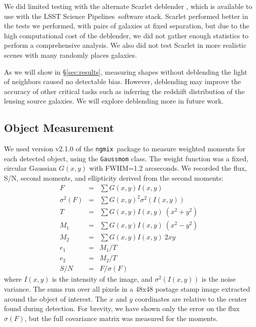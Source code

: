 \documentclass[twocolumn,twocolappendix,astrosym]{openjournal}
\newcommand{\ngmix}{\texttt{ngmix}}
\newcommand{\dm}{LSST Science Pipelines}
\begin{document}
We did limited testing with the alternate Scarlet deblender
\citep{MelchiorScarlet2018}, which is available to use with the \dm\ software
stack. Scarlet performed better in the tests we performed, with pairs of
galaxies at fixed separation, but due to the high computational cost of the
deblender, we did not gather enough statistics to perform a comprehensive
analysis.  We also did not test Scarlet in more realistic scenes with many
randomly places galaxies.

As we will show in \S \ref{sec:results}, measuring shapes without deblending
the light of neighbors caused no detectable bias.  However, deblending may
improve the accuracy of other critical tasks such as inferring the redshift
distribution of the lensing source galaxies.  We will explore deblending more
in future work.

\subsection{Object Measurement} \label{sec:mdet:meas}

We used version v2.1.0 of the \ngmix\ package to measure weighted moments for
each detected object, using the \texttt{Gaussmom} class. The weight function
was a fixed, circular Gaussian $G(x, y)$ with FWHM=1.2 arcseconds.  We
recorded the flux, S/N, second moments, and ellipticity derived from the second
moments:
\begin{eqnarray} \label{eq:moments}
    F &=& \sum G(x, y) I(x, y) \nonumber \\
    \sigma^2(F) &=& \sum G(x, y)^2 \sigma^2(I(x, y)) \nonumber \\
    T &=& \sum G(x, y) I(x, y) ~ (x^2 + y^2) \nonumber \\
    M_1 &=& \sum G(x, y) I(x, y) ~ (x^2 - y^2) \\
    M_2 &=& \sum G(x, y) I(x, y) ~ 2 x y \nonumber \\
    e_1 &=& M_1 / T \nonumber \\
    e_2 &=& M_2 / T \nonumber \\
    S/N &=& F / \sigma(F) \nonumber
\end{eqnarray}
where $I(x, y)$ is the intensity of the image, and $\sigma^2(I(x, y))$ is the
noise variance. The sums run over all pixels in a 48x48 postage stamp image
extracted around the object of interest.  The $x$ and $y$ coordinates are
relative to the center found during detection. For brevity, we have shown only
the error on the flux $\sigma(F)$, but the full covariance matrix was measured
for the moments.
\end{document}
